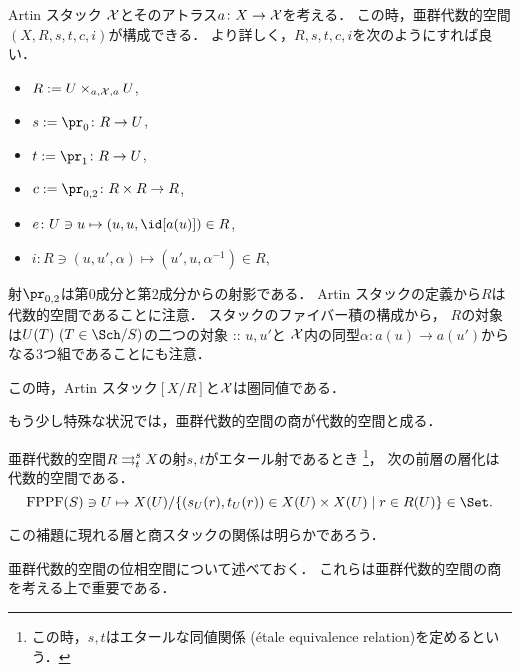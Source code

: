     \begin{Lemma}[\cite{SP} 04T4, 04T5]
        Artin スタック $\mathcal{X}$とそのアトラス$a \colon X \to \mathcal{X}$を考える．
        この時，亜群代数的空間$(X, R, s,t,c,i)$が構成できる．
        より詳しく，$R,s,t,c,i$を次のようにすれば良い．
        \begin{itemize}
            \item $R:=U \times_{a,\mathcal{X},a} U$,
            \item $s:=\pr_0 \colon R \to U$,
            \item $t:=\pr_1 \colon R \to U$,
            \item $c:=\pr_{0,2} \colon R \times R \to R$,
            \item $e \colon U \ni u \mapsto (u,u,\id[a(u)]) \in R$,
            \item $i \colon R \ni (u,u',\alpha) \mapsto (u',u,\alpha^{-1}) \in R$,
        \end{itemize}
        射$\pr_{0,2}$は第$0$成分と第$2$成分からの射影である．
        Artin スタックの定義から$R$は代数的空間であることに注意．
        スタックのファイバー積の構成から，
        $R$の対象は$U(T)\ (T \in \Sch/S)$の二つの対象 :: $u, u'$と
        $\mathcal{X}$内の同型$\alpha \colon a(u) \to a(u')$からなる$3$つ組であることにも注意．
        
        この時，Artin スタック$[X/R]$と$\mathcal{X}$は圏同値である．
    \end{Lemma}

    もう少し特殊な状況では，亜群代数的空間の商が代数的空間と成る．
    \begin{Lemma}[\cite{SP} 02WW]
        亜群代数的空間$R \mathrel{\mathop{\rightrightarrows}^{s}_{t}} X$の射$s,t$がエタール射であるとき
        \footnote{ この時，$s,t$はエタールな同値関係 (\'{e}tale equivalence relation)を定めるという． }，
        次の前層の層化は代数的空間である．
        \[ \FPPF(S) \ni U \mapsto X(U)/\{ (s_U(r), t_U(r))  \in X(U) \times X(U) \mid r \in R(U) \} \in \Set. \]
    \end{Lemma}
    この補題に現れる層と商スタックの関係は明らかであろう．

    亜群代数的空間の位相空間について述べておく．
    これらは亜群代数的空間の商を考える上で重要である．

